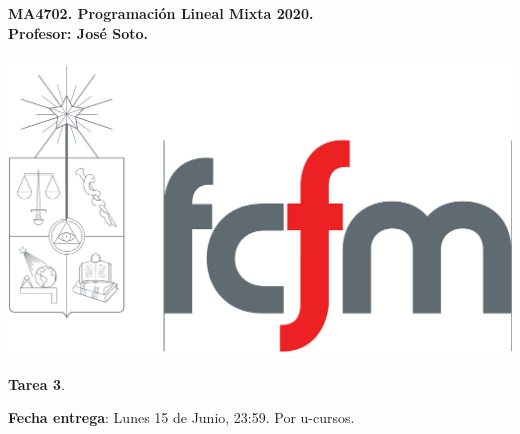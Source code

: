\documentclass{article}
\theoremstyle{plain}
\theoremstyle{definition}
\theoremstyle{Azul}
\begin{document}
\setlength{\headheight}{14pt}
\vspace*{-1.2 cm}
\begin{minipage}{0.6\textwidth}
	\begin{flushleft}
		\hspace*{-0.5cm}\textbf{MA4702. Programación Lineal Mixta 2020.}\\
		\hspace*{-0.5cm}\textbf{Profesor: José Soto.}\\
	\end{flushleft}
\end{minipage}
\begin{minipage}{0.36\textwidth}
	\begin{flushright}
		\includegraphics[scale=0.15]{fcfm.pdf}
	\end{flushright}
\end{minipage}
\bigskip

\newif\ifsol
\soltrue
\solfalse

\begin{center}
  \LARGE \textbf{Tarea 3}.\\
\end{center}
\bigskip

\noindent\textbf{Fecha entrega}: Lunes 15 de Junio, 23:59. Por u-cursos.
\end{document}
